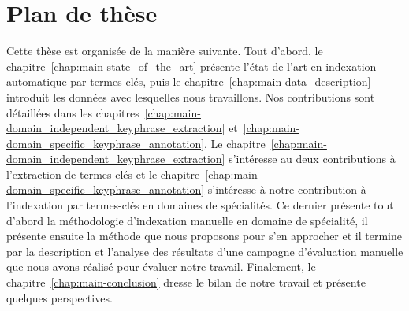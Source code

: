 
  \section{Plan de thèse}
  \label{sec:main-introduction-outline}
    Cette thèse est organisée de la manière suivante. Tout d'abord, le
    chapitre~\ref{chap:main-state_of_the_art} présente l'état de l'art en
    indexation automatique par termes-clés, puis le
    chapitre~\ref{chap:main-data_description} introduit les données avec
    lesquelles nous travaillons. Nos contributions sont détaillées dans les
    chapitres~\ref{chap:main-domain_independent_keyphrase_extraction}
    et~\ref{chap:main-domain_specific_keyphrase_annotation}. Le
    chapitre~\ref{chap:main-domain_independent_keyphrase_extraction} s'intéresse
    au deux contributions à l'extraction de termes-clés et le
    chapitre~\ref{chap:main-domain_specific_keyphrase_annotation} s'intéresse à
    notre contribution à l'indexation par termes-clés en domaines de
    spécialités. Ce dernier présente tout d'abord la méthodologie d'indexation
    manuelle en domaine de spécialité, il présente ensuite la méthode que nous
    proposons pour s'en approcher et il termine par la description et l'analyse
    des résultats d'une campagne d'évaluation manuelle que nous avons réalisé
    pour évaluer notre travail. Finalement, le
    chapitre~\ref{chap:main-conclusion} dresse le bilan de notre travail et
    présente quelques perspectives.

